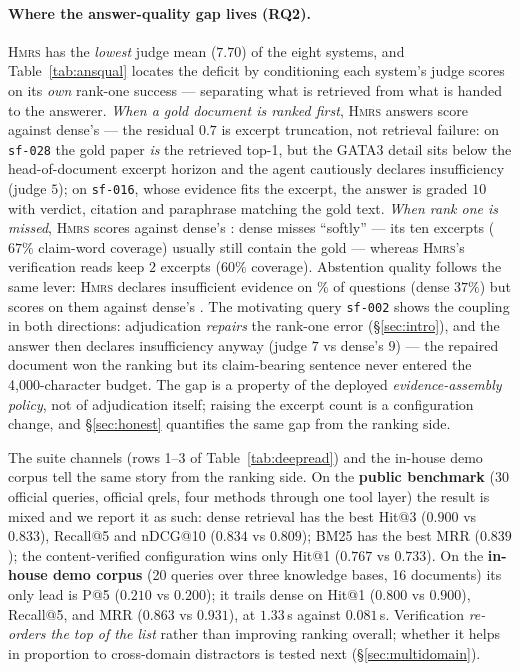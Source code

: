 \documentclass[sigconf, review, anonymous]{acmart}
\newcommand{\sys}{\textsc{Hmrs}}
\begin{document}
\paragraph{Where the answer-quality gap lives (RQ2).}
\sys{} has the \emph{lowest} judge mean ($7.70$) of the eight systems, and
Table~\ref{tab:ansqual} locates the deficit by conditioning each system's
judge scores on its \emph{own} rank-one success --- separating what is
retrieved from what is handed to the answerer. \emph{When a gold document is
ranked first}, \sys{} answers score \hmrsJhit{} against dense's \denseJhit{}
--- the residual $0.7$ is excerpt truncation, not retrieval failure: on
\texttt{sf-028} the gold paper \emph{is} the retrieved top-1, but the GATA3
detail sits below the head-of-document excerpt horizon and the agent
cautiously declares insufficiency (judge $5$); on \texttt{sf-016}, whose
evidence fits the excerpt, the answer is graded $10$ with verdict, citation
and paraphrase matching the gold text. \emph{When rank one is missed},
\sys{} scores \hmrsJmiss{} against dense's \denseJmiss{}: dense misses
``softly'' --- its ten excerpts ($67\%$ claim-word coverage) usually still
contain the gold --- whereas \sys{}'s verification reads keep $2$ excerpts
($60\%$ coverage). Abstention quality follows the same lever: \sys{} declares
insufficient evidence on \hmrsAbstain\% of questions (dense $37\%$) but
scores \hmrsJabs{} on them against dense's \denseJabs{}. The motivating
query \texttt{sf-002} shows the coupling in both directions: adjudication
\emph{repairs} the rank-one error (\S\ref{sec:intro}), and the answer then
declares insufficiency anyway (judge $7$ vs dense's $9$) --- the repaired
document won the ranking but its claim-bearing sentence never entered the
4{,}000-character budget. The gap is a property of the deployed
\emph{evidence-assembly policy}, not of adjudication itself; raising the
excerpt count is a configuration change, and \S\ref{sec:honest} quantifies
the same gap from the ranking side.



The suite channels (rows 1--3 of Table~\ref{tab:deepread}) and the in-house
demo corpus tell the same story from the ranking side. On the
\textbf{public benchmark} (30 official queries, official qrels, four methods
through one tool layer) the result is mixed and we report it as such: dense
retrieval has the best Hit@3 ($0.900$ vs $0.833$), Recall@5 and nDCG@10
($0.834$ vs $0.809$); BM25 has the best MRR ($0.839$); the content-verified
configuration wins only Hit@1 ($0.767$ vs $0.733$). On the \textbf{in-house
demo corpus} (20 queries over three knowledge bases, 16 documents) its only
lead is P@5 ($0.210$ vs $0.200$); it trails dense on Hit@1 ($0.800$ vs
$0.900$), Recall@5, and MRR ($0.863$ vs $0.931$), at $1.33$\,s against
$0.081$\,s. Verification \emph{re-orders the top of the list} rather than
improving ranking overall; whether it helps in proportion to cross-domain
distractors is tested next (\S\ref{sec:multidomain}).
\end{document}
